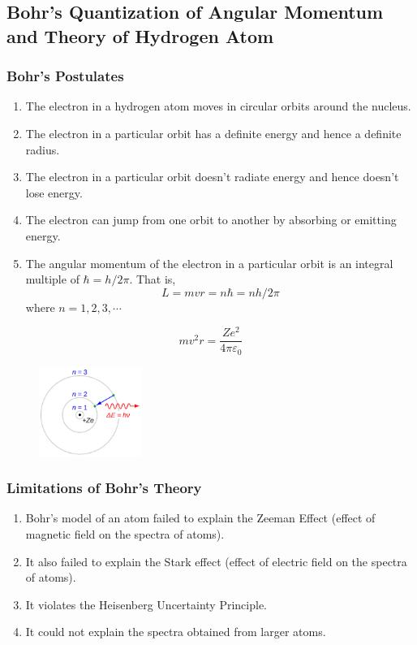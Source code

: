\documentclass[12pt]{article}
\numberwithin{equation}{subsection}
\begin{document}
\subsection{Bohr's Quantization of Angular Momentum and Theory of Hydrogen Atom}
\subsubsection{Bohr's Postulates}
\begin{enumerate}
    \item The electron in a hydrogen atom moves in circular orbits around the nucleus.
    \item The electron in a particular orbit has a definite energy and hence a definite radius.
    \item The electron in a particular orbit doesn't radiate energy and hence doesn't lose energy.
    \item The electron can jump from one orbit to another by absorbing or emitting energy.
    \item The angular momentum of the electron in a particular orbit is an integral multiple of $\hbar = h/2\pi$. That is,
        \begin{equation}
            L = mvr = n\hbar = nh/2\pi
        \end{equation}
    where $n = 1, 2, 3, \cdots$
\end{enumerate}
\begin{equation}
    mv^2r = \frac{Ze^2}{4\pi\varepsilon_0}
\end{equation}

\begin{figure}[htpb]
    \centering
    \includegraphics[width=0.3\textwidth]{Bohr's hydrogen.png}
\end{figure}

\subsubsection{Limitations of Bohr's Theory}
\begin{enumerate}
    \item Bohr’s model of an atom failed to explain the Zeeman Effect (effect of magnetic field on the spectra of atoms).
    \item It also failed to explain the Stark effect (effect of electric field on the spectra of atoms).
    \item It violates the Heisenberg Uncertainty Principle.
    \item It could not explain the spectra obtained from larger atoms.
\end{enumerate}
\end{document}

